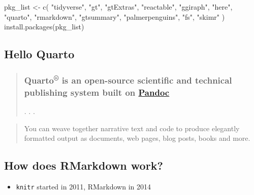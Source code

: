 \documentclass[
  letterpaper,
  DIV=11,
  numbers=noendperiod]{scrartcl}
\newenvironment{Shaded}{\begin{snugshade}}{\end{snugshade}}
\newcommand{\FunctionTok}[1]{\textcolor[rgb]{0.28,0.35,0.67}{#1}}
\newcommand{\NormalTok}[1]{\textcolor[rgb]{0.00,0.23,0.31}{#1}}
\newcommand{\OtherTok}[1]{\textcolor[rgb]{0.00,0.23,0.31}{#1}}
\newcommand{\StringTok}[1]{\textcolor[rgb]{0.13,0.47,0.30}{#1}}
\providecommand{\tightlist}{%
  \setlength{\itemsep}{0pt}\setlength{\parskip}{0pt}}\usepackage{longtable,booktabs,array}
\begin{document}
\begin{Shaded}
\begin{Highlighting}[]
\NormalTok{pkg\_list }\OtherTok{\textless{}{-}} \FunctionTok{c}\NormalTok{(}
  \StringTok{"tidyverse"}\NormalTok{, }\StringTok{"gt"}\NormalTok{, }\StringTok{"gtExtras"}\NormalTok{, }\StringTok{"reactable"}\NormalTok{, }\StringTok{"ggiraph"}\NormalTok{, }\StringTok{"here"}\NormalTok{, }\StringTok{"quarto"}\NormalTok{,}
  \StringTok{"rmarkdown"}\NormalTok{, }\StringTok{"gtsummary"}\NormalTok{, }\StringTok{"palmerpenguins"}\NormalTok{, }\StringTok{"fs"}\NormalTok{, }\StringTok{"skimr"}
\NormalTok{  )}
\FunctionTok{install.packages}\NormalTok{(pkg\_list)}
\end{Highlighting}
\end{Shaded}

\hypertarget{hello-quarto}{%
\subsection{Hello Quarto}\label{hello-quarto}}

\begin{quote}
\hypertarget{quarto-is-an-open-source-scientific-and-technical-publishing-system-built-on-pandoc}{%
\subsubsection{\texorpdfstring{Quarto\textsuperscript{®} is an
open-source scientific and technical publishing system built on
\href{https://pandoc.org/}{Pandoc}}{Quarto® is an open-source scientific and technical publishing system built on Pandoc}}\label{quarto-is-an-open-source-scientific-and-technical-publishing-system-built-on-pandoc}}

. . .
\end{quote}

\begin{quote}
You can weave together narrative text and code to produce elegantly
formatted output as documents, web pages, blog posts, books and more.
\end{quote}

\hypertarget{how-does-rmarkdown-work}{%
\subsection{How does RMarkdown work?}\label{how-does-rmarkdown-work}}

\begin{itemize}
\tightlist
\item
  \texttt{knitr} started in 2011, RMarkdown in 2014
\end{itemize}
\end{document}
